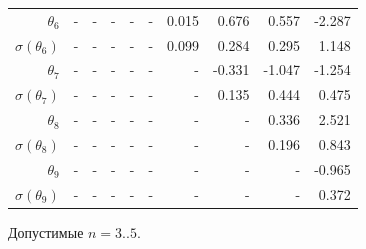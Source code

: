 \documentclass{matmex-diploma-custom}
\begin{document}
\begin{table}[h!!]
\begin{tabular}{r|rr|rrr|rrrr}
 $\theta_6$&-      &    - &    - &    - &    - &   0.015 &    0.676 &    0.557 &   -2.287 \\
 $\sigma(\theta_6)$&-    &    - &    - &    - &    - &   0.099 &    0.284 &    0.295 &    1.148 \\
 $\theta_7$&-     &    - &    - &    - &    - &    - &  -0.331 &   -1.047 &   -1.254 \\
 $ \sigma(\theta_7)$&-     &    - &    - &    - &    - &    - &     0.135 &    0.444 &    0.475 \\
 $\theta_8$&-     &    - &    - &    - &    - &    - &    - &   0.336 &    2.521 \\
 $ \sigma(\theta_8)$&-     &    - &    - &    - &    - &    - &    - &    0.196 &    0.843 \\
 $\theta_9$&-     &    - &    - &    - &    - &    - &    - &    - &  -0.965  \\
 $ \sigma(\theta_9)$&-     &    - &    - &    - &    - &    - &    - &    - &   0.372  \\
\end{tabular}
\end{table}

Допустимые $n = 3 .. 5$.
\pagebreak
%
%
%
%
\pagebreak
\end{document}
